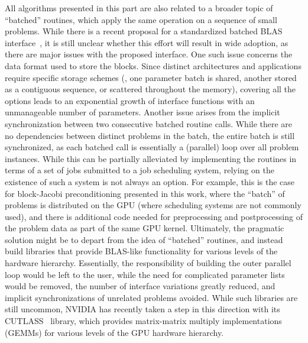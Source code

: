 All algorithms presented in this part are also related to a broader topic of
``batched'' routines, which apply the same operation on a sequence of small
problems. While there is a recent proposal for a standardized batched BLAS
interface~\cite{batched-blas}, it is still unclear whether this effort will result in
wide adoption, as there are major issues with the proposed interface.
One such issue concerns the data format used to store the blocks. Since distinct
architectures and applications require specific storage schemes (\eg, one
parameter batch is shared, another stored as a contiguous sequence, or scattered
throughout the memory), covering all the options leads to an exponential
growth of interface functions with an unmanageable number of parameters.
Another issue arises from the implicit synchronization between two consecutive
batched routine calls. While there are no dependencies between distinct problems
in the batch, the entire batch is still synchronized, as each batched call is
essentially a (parallel) loop over all problem instances. While this can be
partially alleviated by implementing the routines in terms of a set of jobs
submitted to a job scheduling system, relying on the existence of such a system
is not always an option. For example, this is the case for block-Jacobi
preconditioning presented in this work, where the ``batch'' of problems is
distributed on the GPU (where scheduling systems are not commonly used),
and there is additional code needed for preprocessing and postprocessing of the
problem data as part of the same GPU kernel. Ultimately, the pragmatic solution
might be to depart from the idea of ``batched'' routines, and instead build
libraries that provide BLAS-like functionality for various levels of the
hardware hierarchy.  Essentially, the responsibility of building the outer
parallel loop would be left to the user, while the need for complicated
parameter lists would be removed, the number of interface variations greatly
reduced, and implicit synchronizations of unrelated problems avoided. While such
libraries are still uncommon, NVIDIA has recently taken a step in this direction
with its CUTLASS~\cite{cutlass} library, which provides matrix-matrix multiply
implementations (GEMMs) for various levels of the GPU hardware hierarchy.

